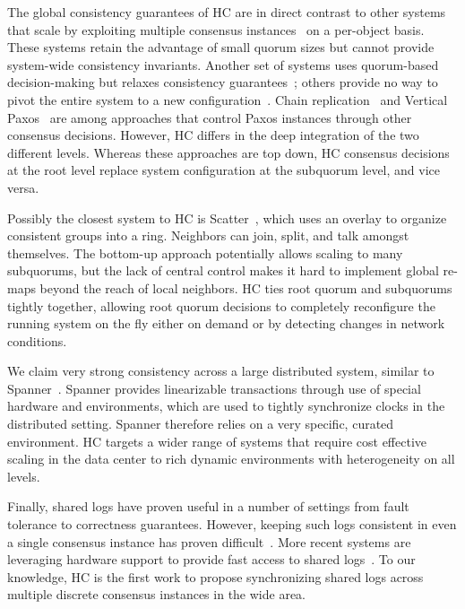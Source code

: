 \documentclass[letterpaper,10pt,twocolumn]{article}
\newcommand{\sub}{subquorum\xspace}
\newcommand{\subs}{subquorums\xspace}
\newcommand{\roo}{root quorum\xspace}
\begin{document}
The global consistency guarantees of HC are in direct contrast to other
systems that scale by exploiting multiple consensus
instances~\cite{bigtable,kraska_mdcc:_2013,spanner} on a per-object basis.
These systems retain the advantage of small quorum sizes but cannot provide
system-wide consistency invariants.
Another set of systems uses quorum-based decision-making but relaxes
consistency guarantees~\cite{dynamo,pnuts,cops}; others provide no way to
pivot the entire system to a new configuration~\cite{scatter}.
Chain replication~\cite{van2004chain} and Vertical Paxos~\cite{verticalPaxos}
are among approaches that control Paxos instances through other consensus
decisions.
However, HC differs in the deep integration of the two different levels.
Whereas these approaches are top down, HC consensus decisions at the root
level replace system configuration at the \sub level, and vice versa.

Possibly the closest system to HC is Scatter~\cite{scatter}, which uses an
overlay to organize consistent groups into a ring.
Neighbors can join, split, and talk amongst themselves.
The bottom-up approach potentially allows scaling to many
\subs, but the lack of central control makes it hard to implement global
re-maps beyond the reach of local neighbors.
HC ties \roo and \subs tightly together, allowing \roo decisions to
completely reconfigure the running system on the fly either on demand or
by detecting changes in network conditions.

We claim very strong consistency across a large distributed system, similar
to Spanner~\cite{spanner}.
Spanner provides linearizable  transactions through use of special hardware
and environments, which are used to tightly synchronize clocks in the
distributed setting.
Spanner therefore relies on a very specific, curated environment.
HC targets a wider range of systems that require cost effective scaling in
the data center to rich dynamic environments with heterogeneity on all levels.

Finally, shared logs have proven useful in a number of settings from fault
tolerance to correctness guarantees.
However, keeping such logs consistent in even a single consensus instance has
proven difficult~\cite{chubby,gfs,zookeeper}.
More recent systems are leveraging hardware support to provide fast access to
shared logs~\cite{vcorfu,tango,calvin,calvinfs,hyder-a,fawn}.
To our knowledge, HC is the first work to propose synchronizing shared logs
across multiple discrete consensus instances
in the wide area.
\end{document}
